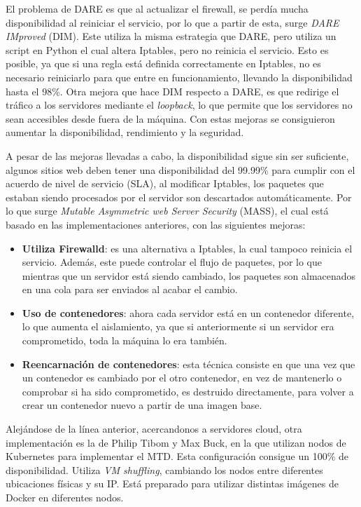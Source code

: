 El problema de DARE es que al actualizar el firewall, se perdía mucha disponibilidad al reiniciar el servicio, por lo que a partir de esta, surge \textit{DARE IMproved} (DIM)\cite{DIM}. Este utiliza la misma estrategia que DARE, pero utiliza un script en Python el cual altera Iptables, pero no reinicia el servicio. Esto es posible, ya que si una regla está definida correctamente en Iptables, no es necesario reiniciarlo para que entre en funcionamiento, llevando la disponibilidad hasta el 98\%. Otra mejora que hace DIM respecto a DARE, es que redirige el tráfico a los servidores mediante el \textit{loopback}, lo que permite que los servidores no sean accesibles desde fuera de la máquina. Con estas mejoras se consiguieron aumentar la disponibilidad, rendimiento y la seguridad.

A pesar de las mejoras llevadas a cabo, la disponibilidad sigue sin ser suficiente, algunos sitios web deben tener una disponibilidad del 99.99\% para cumplir con el acuerdo de nivel de servicio (SLA)\cite{SLA}, al modificar Iptables, los paquetes que estaban siendo procesados por el servidor son descartados automáticamente. Por lo que surge \textit{Mutable Asymmetric web Server Security} (MASS)\cite{MTD-DARE-DIM-MASS}, el cual está basado en las implementaciones anteriores, con las siguientes mejoras:
\begin{itemize}
    \item \textbf{Utiliza Firewalld\cite{firewalld}}: es una alternativa a Iptables, la cual tampoco reinicia el servicio. Además, este puede controlar el flujo de paquetes, por lo que mientras que un servidor está siendo cambiado, los paquetes son almacenados en una cola para ser enviados al acabar el cambio.
    \item \textbf{Uso de contenedores}: ahora cada servidor está en un contenedor diferente, lo que aumenta el aislamiento, ya que si anteriormente si un servidor era comprometido, toda la máquina lo era también.
    \item \textbf{Reencarnación de contenedores}: esta técnica consiste en que una vez que un contenedor es cambiado por el otro contenedor, en vez de mantenerlo o comprobar si ha sido comprometido, es destruido directamente, para volver a crear un contenedor nuevo a partir de una imagen base.
\end{itemize}

Alejándose de la línea anterior, acercandonos a servidores cloud, otra implementación es la de Philip Tibom y Max Buck\cite{MTD-gotemburgo}, en la que utilizan nodos de Kubernetes\cite{kubernetes} para implementar el MTD. Esta configuración consigue un 100\% de disponibilidad. Utiliza \textit{VM shuffling}, cambiando los nodos entre diferentes ubicaciones físicas y su IP. Está preparado para utilizar distintas imágenes de Docker en diferentes nodos.

